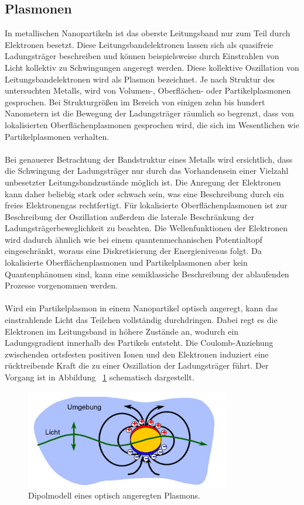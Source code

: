 \subsection{Plasmonen}
In metallischen Nanopartikeln ist das oberste Leitungsband nur zum Teil durch Elektronen besetzt. Diese Leitungsbandelektronen lassen sich als quasifreie Ladungsträger beschreiben und können beispielsweise durch Einstrahlen von Licht kollektiv zu Schwingungen angeregt werden. Diese kollektive Oszillation von Leitungsbandelektronen wird als Plasmon bezeichnet. Je nach Struktur des untersuchten Metalls, wird von Volumen-, Oberflächen- oder Partikelplasmonen gesprochen. Bei Strukturgrößen im Bereich von einigen zehn bis hundert Nanometern ist die Bewegung der Ladungsträger räumlich so begrenzt, dass von lokalisierten Oberflächenplasmonen gesprochen wird, die sich im Wesentlichen wie Partikelplasmonen verhalten.\\
\\
Bei genauerer Betrachtung der Bandstruktur eines Metalls wird ersichtlich, dass die Schwingung der Ladungsträger nur durch das Vorhandensein einer Vielzahl unbesetzter Leitungsbandzustände möglich ist. Die Anregung der Elektronen kann daher beliebig stark oder schwach sein, was eine Beschreibung durch ein freies Elektronengas rechtfertigt. Für lokalisierte Oberflächenplasmonen ist zur Beschreibung der Oszillation außerdem die laterale Beschränkung der Ladungsträgerbeweglichkeit zu beachten. Die Wellenfunktionen der Elektronen wird dadurch ähnlich wie bei einem quantenmechanischen Potentialtopf eingeschränkt, woraus eine Diskretisierung der Energieniveaus folgt. Da lokalisierte Oberflächenplasmonen und Partikelplasmonen aber kein Quantenphänomen sind, kann eine semiklassiche Beschreibung der ablaufenden Prozesse vorgenommen werden. \cite{anleitung}\cite{bayreuth}\\
\\
Wird ein Partikelplasmon in einem Nanopartikel optisch angeregt, kann das einstrahlende Licht das Teilchen vollständig durchdringen. Dabei regt es die Elektronen im Leitungsband in höhere Zustände an, wodurch ein Ladungsgradient innerhalb des Partikels entsteht. Die Coulomb-Anziehung zwischenden ortsfesten positiven Ionen und den Elektronen induziert eine rücktreibende Kraft die zu einer Oszillation der Ladungsträger führt. Der Vorgang ist in Abbildung ~\ref{fig:dipol} schematisch dargestellt.
\begin{figure}[H]
  \centering
  \includegraphics[width=0.8\textwidth]{plots/dipolplamson.jpg}
  \caption{Dipolmodell eines optisch angeregten Plasmons. \cite{anleitung}}
  \label{fig:dipol}
\end{figure}
